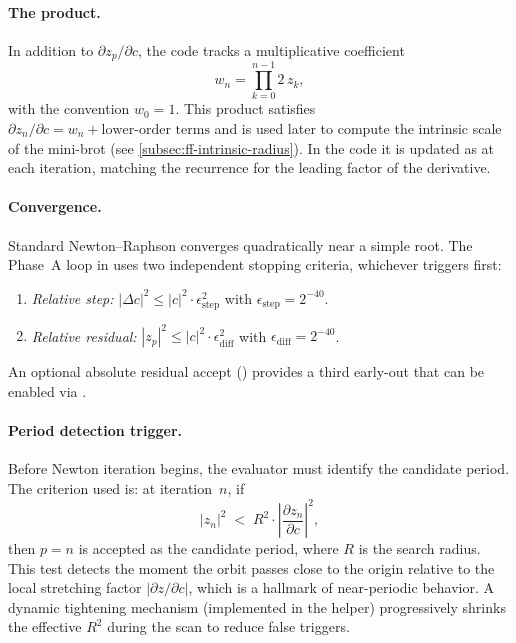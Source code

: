 \paragraph{The  product.}
In addition to $\partial z_p/\partial c$, the code tracks a multiplicative
coefficient
\begin{equation}\label{eq:ff-zcoeff}
w_n = \prod_{k=0}^{n-1} 2\,z_k,
\end{equation}
with the convention $w_0=1$.  This product satisfies
$\partial z_n/\partial c = w_n + \text{lower-order terms}$ and is used later
to compute the intrinsic scale of the mini-brot (see
\cref{subsec:ff-intrinsic-radius}).  In the code it is updated as
 at each iteration, matching the recurrence for the
leading factor of the derivative.

\paragraph{Convergence.}
Standard Newton--Raphson converges quadratically near a simple root.  The
Phase~A loop in  uses two independent
stopping criteria, whichever triggers first:
\begin{enumerate}
\item \emph{Relative step:}
  $|\Delta c|^2 \le |c|^2 \cdot \epsilon_{\mathrm{step}}^2$
  with $\epsilon_{\mathrm{step}} = 2^{-40}$.
\item \emph{Relative residual:}
  $|z_p|^2 \le |c|^2 \cdot \epsilon_{\mathrm{diff}}^2$
  with $\epsilon_{\mathrm{diff}} = 2^{-40}$.
\end{enumerate}
An optional absolute residual accept () provides a third
early-out that can be enabled via .

\paragraph{Period detection trigger.}
Before Newton iteration begins, the evaluator must identify the candidate
period.  The criterion used is: at iteration~$n$, if
\begin{equation}\label{eq:ff-period-trigger}
|z_n|^2 \;<\; R^2 \cdot \left|\frac{\partial z_n}{\partial c}\right|^2,
\end{equation}
then $p = n$ is accepted as the candidate period, where $R$ is the search
radius.  This test detects the moment the orbit passes close to the origin
relative to the local stretching factor $|\partial z/\partial c|$, which is
a hallmark of near-periodic behavior.  A dynamic tightening mechanism
(implemented in the  helper) progressively shrinks the
effective $R^2$ during the scan to reduce false triggers.

